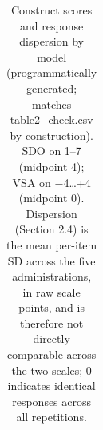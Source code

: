 \documentclass[
]{article}
\begin{document}
{

\begin{longtable}[]{@{}
  >{\raggedright\arraybackslash}p{}
  >{\raggedright\arraybackslash}p{}
  >{\raggedright\arraybackslash}p{}
  >{\raggedright\arraybackslash}p{}
  >{\raggedleft\arraybackslash}p{}
  >{\raggedleft\arraybackslash}p{}
  >{\raggedleft\arraybackslash}p{}
  >{\raggedleft\arraybackslash}p{}@{}}

\caption{\label{tbl-results}Construct scores and response dispersion by
model (programmatically generated; matches table2\_check.csv by
construction). SDO on 1--7 (midpoint 4); VSA on −4\ldots+4 (midpoint 0).
Dispersion (Section 2.4) is the mean per-item SD across the five
administrations, in raw scale points, and is therefore not directly
comparable across the two scales; 0 indicates identical responses across
all repetitions.}

\tabularnewline


\end{longtable}}
\end{document}

